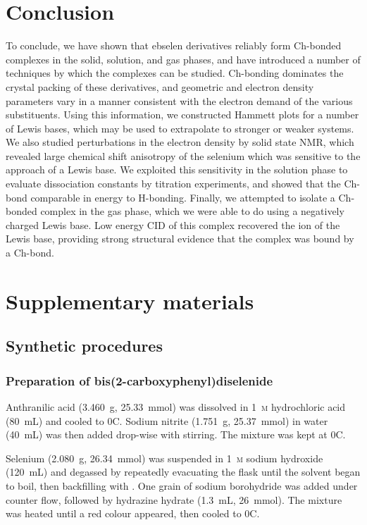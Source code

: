 \begin{refsection}
\section{Conclusion}
To conclude, we have shown that ebselen derivatives reliably form Ch-bonded complexes in the solid, solution, and gas phases, and have introduced a number of techniques by which the complexes can be studied.
Ch-bonding dominates the crystal packing of these derivatives, and geometric and electron density parameters vary in a manner consistent with the electron demand of the various substituents.
Using this information, we constructed Hammett plots for a number of Lewis bases, which may be used to extrapolate to stronger or weaker systems.
We also studied perturbations in the electron density by solid state NMR, which revealed large chemical shift anisotropy of the selenium which was sensitive to the approach of a Lewis base.
We exploited this sensitivity in the solution phase to evaluate dissociation constants by titration experiments, and showed that the Ch-bond comparable in energy to H-bonding.
Finally, we attempted to isolate a Ch-bonded complex in the gas phase, which we were able to do using a negatively charged Lewis base.
Low energy CID of this complex recovered the ion of the Lewis base, providing strong structural evidence that the complex was bound by a Ch-bond.

\section{Supplementary materials}

\subsection{Synthetic procedures}

\subsubsection[Preparation of \refcmpd{diselenide}]{Preparation of bis(2-carboxyphenyl)diselenide }\label{sec:diselenide_prep}
Anthranilic acid (3.460~g, 25.33~mmol) was dissolved in 1~\textsc{m} hydrochloric acid (80~mL) and cooled to 0\degree{}C.
Sodium nitrite (1.751~g, 25.37~mmol) in water (40~mL) was then added drop-wise with stirring.
The mixture was kept at 0\degree{}C.

Selenium (2.080~g, 26.34~mmol) was suspended in 1~\textsc{m} sodium hydroxide (120~mL) and degassed by repeatedly evacuating the flask until the solvent began to boil, then backfilling with .
One grain of sodium borohydride was added under  counter flow, followed by hydrazine hydrate (1.3~mL, 26~mmol).
The mixture was heated until a red colour appeared, then cooled to 0\degree{}C.


\end{refsection}
